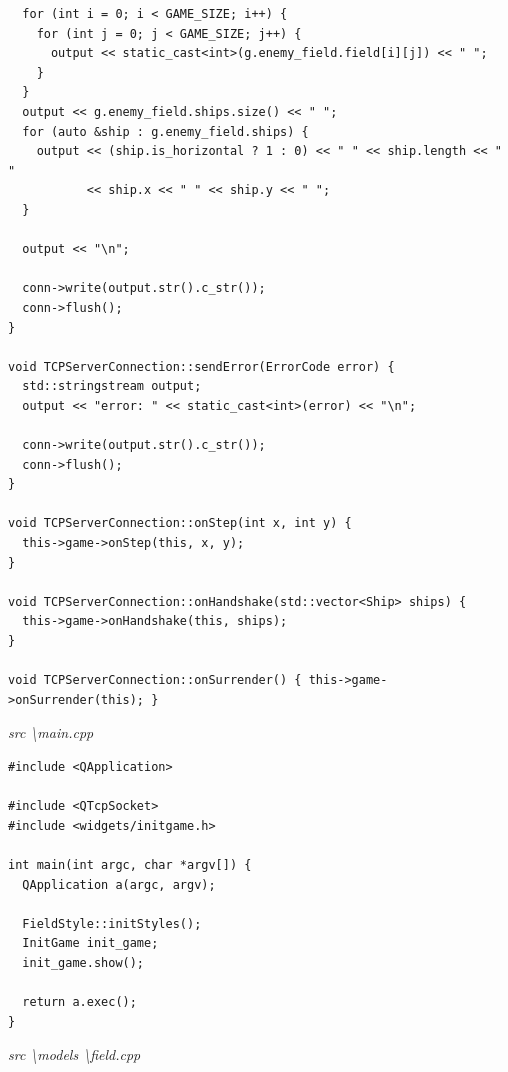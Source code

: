 \documentclass[a4paper,14pt]{extarticle}
\begin{document}
\begin{verbatim}
  for (int i = 0; i < GAME_SIZE; i++) {
    for (int j = 0; j < GAME_SIZE; j++) {
      output << static_cast<int>(g.enemy_field.field[i][j]) << " ";
    }
  }
  output << g.enemy_field.ships.size() << " ";
  for (auto &ship : g.enemy_field.ships) {
    output << (ship.is_horizontal ? 1 : 0) << " " << ship.length << " "
           << ship.x << " " << ship.y << " ";
  }

  output << "\n";

  conn->write(output.str().c_str());
  conn->flush();
}

void TCPServerConnection::sendError(ErrorCode error) {
  std::stringstream output;
  output << "error: " << static_cast<int>(error) << "\n";

  conn->write(output.str().c_str());
  conn->flush();
}

void TCPServerConnection::onStep(int x, int y) {
  this->game->onStep(this, x, y);
}

void TCPServerConnection::onHandshake(std::vector<Ship> ships) {
  this->game->onHandshake(this, ships);
}

void TCPServerConnection::onSurrender() { this->game->onSurrender(this); }

\end{verbatim}
\textit{src \textbackslash main.cpp}
\begin{verbatim}
#include <QApplication>

#include <QTcpSocket>
#include <widgets/initgame.h>

int main(int argc, char *argv[]) {
  QApplication a(argc, argv);

  FieldStyle::initStyles();
  InitGame init_game;
  init_game.show();

  return a.exec();
}

\end{verbatim}
\textit{src \textbackslash models \textbackslash field.cpp}
\end{document}
